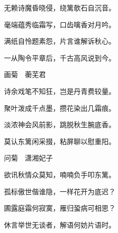 \begin{poem}
\begin{pl}
        无赖诗魔昏晓侵，绕篱欹石自沉音。
    \end{pl}
    \begin{pl}

        毫端蕴秀临霜写，口齿噙香对月吟。
    \end{pl}
    \begin{pl}

        满纸自怜题素怨，片言谁解诉秋心。
    \end{pl}
    \begin{pl}

        一从陶令平章后，千古高风说到今。
    \end{pl}

    \emptypl
    \begin{pl}

        画菊　蘅芜君
    \end{pl}
    \begin{pl}

        诗余戏笔不知狂，岂是丹青费较量。
    \end{pl}
    \begin{pl}

        聚叶泼成千点墨，攒花染出几霜痕。
    \end{pl}
    \begin{pl}

        淡浓神会风前影，跳脱秋生腕底香。
    \end{pl}
    \begin{pl}

        莫认东篱闲采掇，粘屏聊以慰重阳。
    \end{pl}

    \emptypl
    \begin{pl}

        问菊　潇湘妃子
    \end{pl}
    \begin{pl}

        欲讯秋情众莫知，喃喃负手叩东篱。
    \end{pl}
    \begin{pl}

        孤标傲世偕谁隐，一样花开为底迟？
    \end{pl}
    \begin{pl}

        圃露庭霜何寂寞，雁归蛩病可相思？
    \end{pl}
    \begin{pl}

        休言举世无谈者，解语何妨片语时。
    \end{pl}


\end{poem}
